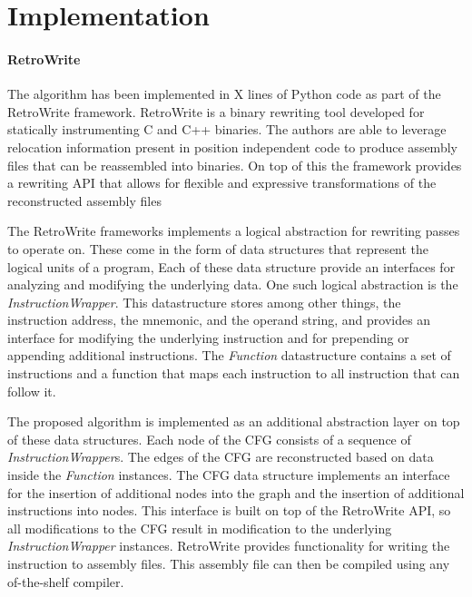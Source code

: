 

\chapter{Implementation}

\subsubsection{RetroWrite}
The algorithm has been implemented in X lines of Python code as part of the RetroWrite framework. 
RetroWrite is a binary rewriting tool developed for statically instrumenting C and C++ binaries. 
The authors are able to leverage relocation information present in position independent code to produce assembly files that can be reassembled into binaries.
On top of this the framework provides a rewriting API that allows for flexible and expressive transformations of the reconstructed assembly files \cite{Dinesh2020RetroWriteSI}

The RetroWrite frameworks implements a logical abstraction for rewriting passes to operate on.
These come in the form of data structures that represent the logical units of a program,
Each of these data structure provide an interfaces for analyzing and modifying the underlying data. 
One such logical abstraction is the \textit{InstructionWrapper}. 
This datastructure stores among other things, the instruction address, the mnemonic, and the operand string, and provides an interface
for modifying the underlying instruction and for prepending or appending additional instructions.  
The \textit{Function} datastructure contains a set of instructions and a function that maps each instruction to all instruction that can follow it. 

The proposed algorithm is implemented as an additional abstraction layer on top of these data structures. 
Each node of the CFG consists of a sequence of \textit{InstructionWrapper}s. 
The edges of the CFG are reconstructed based on data inside the \textit{Function} instances. 
The CFG data structure implements  an interface for the insertion of additional nodes into the graph and the insertion of additional instructions into nodes. 
This interface is built on top of the RetroWrite API, so all modifications to the CFG result in modification to the underlying \textit{InstructionWrapper} instances. 
RetroWrite provides functionality for writing the instruction to assembly files. This assembly file can then be compiled using any of-the-shelf compiler. 


